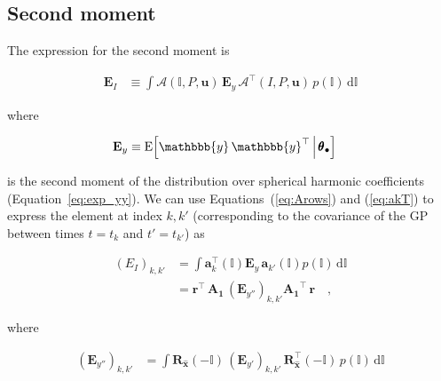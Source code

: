 \documentclass[modern,linenumbers]{aastex62}
\begin{document}
\subsection{Second moment}
\label{sec:inc-mom2}
%
The expression for the second moment is
%
\begin{linenomath}\begin{align}
        \mathbf{E}_I
         & \equiv
        \int
        \pmb{\mathcal{A}}(\mathbb{I}, P, \mathbf{u}) \,
        \mathbf{E}_y \,
        \pmb{\mathcal{A}}^\top(I, P, \mathbf{u}) \,
        p(\mathbb{I}) \,
        \mathrm{d}\mathbb{I}
    \end{align}\end{linenomath}
%
where
%
\begin{linenomath}\begin{align}
        \mathbf{E}_y
         & \equiv
        \mathrm{E} \Big[ \mathbbb{y} \, \mathbbb{y}^\top \, \Big| \, \pmb{\theta}_\bullet \Big]
    \end{align}\end{linenomath}
%
is the second moment of the distribution over spherical harmonic coefficients
(Equation~\ref{eq:exp_yy}). We can use Equations~(\ref{eq:Arows})
and (\ref{eq:akT})
to express the element at index $k, k'$ (corresponding to the covariance of the
GP between times $t = t_k$ and $t' = t_{k'}$) as
%
\begin{linenomath}\begin{align}
        \label{eq:Eikkp}
        \left(E_I\right)_{k, k'}
         & =
        \int
        \mathbf{a}_k^\top(\mathbb{I})
        \mathbf{E}_y \,
        \mathbf{a}_{k'}(\mathbb{I})
        p(\mathbb{I}) \,
        \mathrm{d}\mathbb{I}
        \nonumber \\
         & =
        \mathbf{r}^\top \,
        \mathbf{A_1} \,
        \left(\mathbf{E}_{y''}\right)_{k,k'}
        \mathbf{A_1}^\top \,
        \mathbf{r}
        \quad,
    \end{align}\end{linenomath}
%
where
%
\begin{linenomath}\begin{align}
        \label{eq:Eyppkkp}
        \left(\mathbf{E}_{y''}\right)_{k,k'}
         & =
        \int
        \mathbf{R}_{\hat{\mathbf{x}}}\left(-\mathbb{I}\right) \,
        \left(\mathbf{E}_{y'}\right)_{k,k'} \,
        \mathbf{R}_{\hat{\mathbf{x}}}^\top\left(-\mathbb{I}\right) \,
        p(\mathbb{I}) \,
        \mathrm{d}\mathbb{I}
    \end{align}\end{linenomath}
\end{document}
